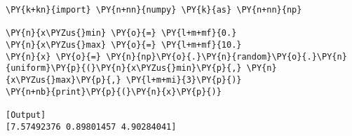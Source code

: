 \begin{Verbatim}[label=\makebox{\href{https://bitbucket.org/lbaldini/statnotes/src/master/snippets/np.random.uniform.py}{https://bitbucket.org/.../np.random.uniform.py}},commandchars=\\\{\}]
\PY{k+kn}{import} \PY{n+nn}{numpy} \PY{k}{as} \PY{n+nn}{np}

\PY{n}{x\PYZus{}min} \PY{o}{=} \PY{l+m+mf}{0.}
\PY{n}{x\PYZus{}max} \PY{o}{=} \PY{l+m+mf}{10.}
\PY{n}{x} \PY{o}{=} \PY{n}{np}\PY{o}{.}\PY{n}{random}\PY{o}{.}\PY{n}{uniform}\PY{p}{(}\PY{n}{x\PYZus{}min}\PY{p}{,} \PY{n}{x\PYZus{}max}\PY{p}{,} \PY{l+m+mi}{3}\PY{p}{)}
\PY{n+nb}{print}\PY{p}{(}\PY{n}{x}\PY{p}{)}

[Output]
[7.57492376 0.89801457 4.90284041]
\end{Verbatim}